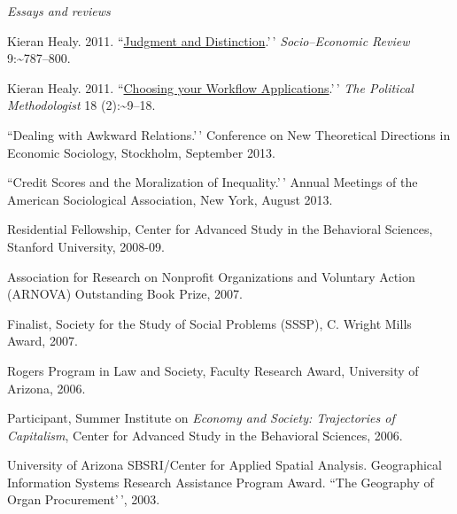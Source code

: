 \documentclass[11pt,article,oneside]{memoir}
\begin{document}
\noindent\emph{Essays and reviews \vspace{0.05in}}

\ind Kieran Healy. 2011.
``\href{http://www.kieranhealy.org/files/reviews/karpik-review.pdf}{Judgment and Distinction}.'\,'
\emph{Socio--Economic Review} 9:\textasciitilde787--800.

\ind Kieran Healy. 2011.
``\href{http://polmeth.wustl.edu/methodologist/tpm_v18_n2.pdf}{Choosing your Workflow Applications}.'\,'
\emph{The Political Methodologist} 18 (2):\textasciitilde9--18.

\bigskip

\medskip

\ind ``Dealing with Awkward Relations.'\,' Conference on New Theoretical
Directions in Economic Sociology, Stockholm, September 2013.

\ind ``Credit Scores and the Moralization of Inequality.'\,' Annual
Meetings of the American Sociological Association, New York, August
2013.

\bigskip

\medskip

\ind Residential Fellowship, Center for Advanced Study in the Behavioral
Sciences, Stanford University, 2008-09.

\ind Association for Research on Nonprofit Organizations and Voluntary
Action (ARNOVA) Outstanding Book Prize, 2007.

\ind Finalist, Society for the Study of Social Problems (SSSP), C.
Wright Mills Award, 2007.

\ind Rogers Program in Law and Society, Faculty Research Award,
University of Arizona, 2006.

\ind Participant, Summer Institute on
\emph{Economy and Society: Trajectories of Capitalism}, Center for
Advanced Study in the Behavioral Sciences, 2006.

\ind University of Arizona SBSRI/Center for Applied Spatial Analysis.
Geographical Information Systems Research Assistance Program Award.
``The Geography of Organ Procurement'\,', 2003.

\medskip

\medskip

\medskip

\medskip
\end{document}
